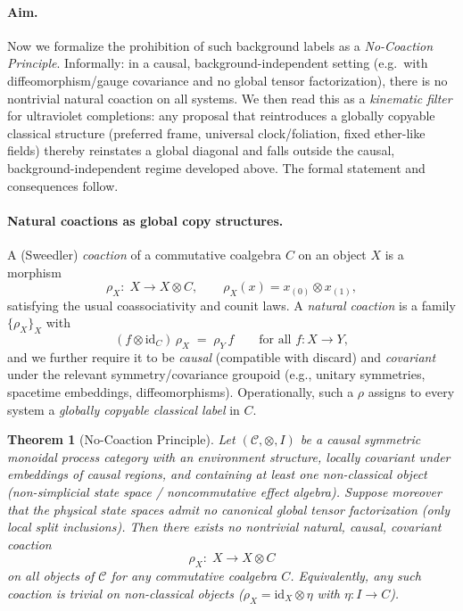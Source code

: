 \documentclass[11pt]{article}
\theoremstyle{upright}
\newtheorem{theorem}{Theorem}
\begin{document}
\paragraph{Aim.}
Now we formalize the prohibition of such background labels as a \emph{No-Coaction Principle}. Informally: in a causal, background-independent setting (e.g.\ with diffeomorphism/gauge covariance and no global tensor factorization), there is no nontrivial natural coaction on all systems. We then read this as a \emph{kinematic filter} for ultraviolet completions: any proposal that reintroduces a globally copyable classical structure (preferred frame, universal clock/foliation, fixed ether-like fields) thereby reinstates a global diagonal and falls outside the causal, background-independent regime developed above. The formal statement and consequences follow.

\paragraph{Natural coactions as global copy structures.}
A (Sweedler) \emph{coaction} of a commutative coalgebra $C$ on an object $X$ is a morphism
\[
\rho_X:\; X \longrightarrow X \otimes C,\qquad
\rho_X(x)=x_{(0)}\!\otimes x_{(1)},
\]
satisfying the usual coassociativity and counit laws. A \emph{natural coaction} is a family $\{\rho_X\}_X$ with
\[
(f\otimes \mathrm{id}_C)\,\rho_X \;=\; \rho_Y\, f\qquad \text{for all } f:X\to Y,
\]
and we further require it to be \emph{causal} (compatible with discard) and \emph{covariant} under the relevant symmetry/covariance groupoid (e.g., unitary symmetries, spacetime embeddings, diffeomorphisms). Operationally, such a $\rho$ assigns to every system a \emph{globally copyable classical label} in $C$.

\begin{theorem}[No-Coaction Principle]
\label{thm:no-coaction}
Let $(\mathcal{C},\otimes,I)$ be a causal symmetric monoidal process category with an environment structure, locally covariant under embeddings of causal regions, and containing at least one non-classical object (non-simplicial state space / noncommutative effect algebra). Suppose moreover that the physical state spaces admit no canonical global tensor factorization (only local split inclusions). Then there exists \emph{no nontrivial} natural, causal, covariant coaction
\[
\rho_X:\; X \longrightarrow X\otimes C
\]
on all objects of $\mathcal{C}$ for any commutative coalgebra $C$. Equivalently, any such coaction is trivial on non-classical objects ($\rho_X = \mathrm{id}_X\otimes \eta$ with $\eta:I\to C$).
\end{theorem}
\end{document}
